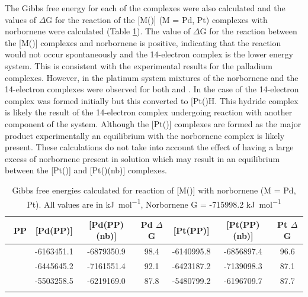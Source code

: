 The Gibbs free energy for each of the complexes were also calculated and the values of $\Delta$G for the reaction of the [M(\tBuxantphos)] (M = Pd, Pt) complexes with norbornene  were calculated (Table \ref{DFT:nbenergy}).  The value of $\Delta$G for the reaction between the [M(\tBuxantphos)] complexes and norbornene is positive, indicating that the reaction would not occur spontaneously and the 14-electron complex is the lower energy system.  This is consistent with the experimental results for the palladium complexes.  However, in the platinum system mixtures of the norbornene and the 14-electron complexes were observed for both \tBusixantphos{} and \tButhixantphos.  In the case of \tBuxantphos{} the 14-electron complex was formed initially but this converted to [Pt(\tBuxantphosk)H\ce{]+}.  This hydride complex is likely the result of the 14-electron complex undergoing reaction with another component of the system.  Although the [Pt(\tBuxantphos)] complexes are formed as the major product experimentally an equilibrium with the norbornene complex is likely present.  These calculations do not take into account the effect of having a large excess of norbornene present in solution which may result in an equilibrium between the [Pt(\tBuxantphos)] and [Pt(\tBuxantphos)(nb)] complexes.  

\begin{table}
\caption[Gibbs free energies calculated for the formation of [M(\tBuxantphos)(nb){]}]{Gibbs free energies calculated for reaction of [M(\tBuxantphos)] with norbornene (M = Pd, Pt).  All values are in \si{\kilo\joule\per\mole}, Norbornene G = -715998.2 \si{\kilo\joule\per\mole}}
\vspace{1em}
\label{DFT:nbenergy}
\small
\begin{center}
\begin{tabular}{l c c c c c c}
	\toprule
	~\bfseries{PP} & {[}Pd(PP)] & {[}Pd(PP)(nb)] & Pd $\Delta$G & {[}Pt(PP)] & {[}Pt(PP)(nb)] & Pt $\Delta$G \\
	\midrule		
	~\tBuSixantphos	& -6163451.1	& -6879350.9 & 98.4 & -6140995.8 & -6856897.4 & 96.6 \\
	~\tBuThixantphos	& -6445645.2	& -7161551.4 & 92.1 & -6423187.2 & -7139098.3 & 87.1 \\
	~\tBuXantphos{}	& -5503258.5	& -6219169.0 & 87.8 & -5480799.2 & -6196709.7 & 87.7 \\
	\bottomrule{}
\end{tabular}
\end{center}
\end{table}

